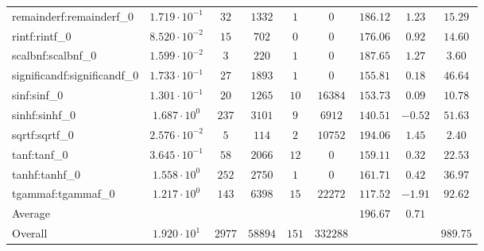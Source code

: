 \begin{tabular}{|l|c|c|c|c|c|c|c|c|}
remainderf:remainderf\_0     & $ 1.719 \cdot 10^{-1} $ & $ 32     $ & $ 1332  $ & $ 1   $ & $ 0      $ & $ 186.12      $ & $ 1.23    $ & $ 15.29   $ \\
rintf:rintf\_0               & $ 8.520 \cdot 10^{-2} $ & $ 15     $ & $ 702   $ & $ 0   $ & $ 0      $ & $ 176.06      $ & $ 0.92    $ & $ 14.60   $ \\
scalbnf:scalbnf\_0           & $ 1.599 \cdot 10^{-2} $ & $ 3      $ & $ 220   $ & $ 1   $ & $ 0      $ & $ 187.65      $ & $ 1.27    $ & $ 3.60    $ \\
significandf:significandf\_0 & $ 1.733 \cdot 10^{-1} $ & $ 27     $ & $ 1893  $ & $ 1   $ & $ 0      $ & $ 155.81      $ & $ 0.18    $ & $ 46.64   $ \\
sinf:sinf\_0                 & $ 1.301 \cdot 10^{-1} $ & $ 20     $ & $ 1265  $ & $ 10  $ & $ 16384  $ & $ 153.73      $ & $ 0.09    $ & $ 10.78   $ \\
sinhf:sinhf\_0               & $ 1.687 \cdot 10^{0}  $ & $ 237    $ & $ 3101  $ & $ 9   $ & $ 6912   $ & $ 140.51      $ & $ -0.52   $ & $ 51.63   $ \\
sqrtf:sqrtf\_0               & $ 2.576 \cdot 10^{-2} $ & $ 5      $ & $ 114   $ & $ 2   $ & $ 10752  $ & $ 194.06      $ & $ 1.45    $ & $ 2.40    $ \\
tanf:tanf\_0                 & $ 3.645 \cdot 10^{-1} $ & $ 58     $ & $ 2066  $ & $ 12  $ & $ 0      $ & $ 159.11      $ & $ 0.32    $ & $ 22.53   $ \\
tanhf:tanhf\_0               & $ 1.558 \cdot 10^{0}  $ & $ 252    $ & $ 2750  $ & $ 1   $ & $ 0      $ & $ 161.71      $ & $ 0.42    $ & $ 36.97   $ \\
tgammaf:tgammaf\_0           & $ 1.217 \cdot 10^{0}  $ & $ 143    $ & $ 6398  $ & $ 15  $ & $ 22272  $ & $ 117.52      $ & $ -1.91   $ & $ 92.62   $ \\
\hline
Average                      & $                     $ & $        $ & $       $ & $     $ & $        $ & $ 196.67      $ & $ 0.71    $ & $         $ \\
\hline
Overall                      & $ 1.920 \cdot 10^{1}  $ & $ 2977   $ & $ 58894 $ & $ 151 $ & $ 332288 $ & $             $ & $         $ & $ 989.75  $ \\
\hline
\end{tabular}
